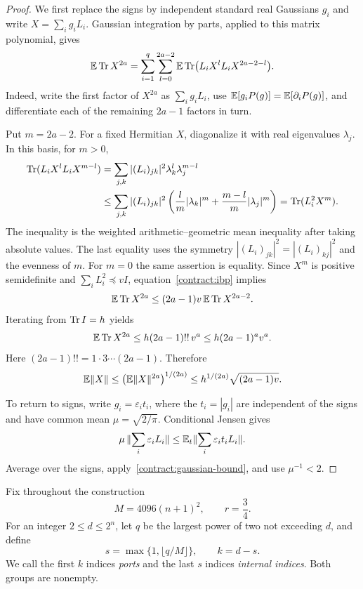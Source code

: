 \begin{proof}
We first replace the signs by independent standard real Gaussians $g_i$ and
write $X=\sum_i g_iL_i$.  Gaussian integration by parts, applied to this matrix
polynomial, gives
\begin{equation}\label{contract:ibp}
 \mathbb E\operatorname{Tr} X^{2a}
 =\sum_{i=1}^q\sum_{l=0}^{2a-2}
   \mathbb E\operatorname{Tr}\bigl(L_iX^lL_iX^{2a-2-l}\bigr).
\end{equation}
Indeed, write the first factor of $X^{2a}$ as $\sum_i g_iL_i$, use
$\mathbb E[g_iP(g)]=\mathbb E[\partial_iP(g)]$, and differentiate each of the remaining
$2a-1$ factors in turn.

Put $m=2a-2$.  For a fixed Hermitian $X$, diagonalize it with real eigenvalues
$\lambda_j$.  In this basis, for $m>0$,
\begin{align*}
 \operatorname{Tr}(L_iX^lL_iX^{m-l})
 &=\sum_{j,k}|(L_i)_{jk}|^2\lambda_k^l\lambda_j^{m-l}\\
 &\leq\sum_{j,k}|(L_i)_{jk}|^2
   \left(\frac lm|\lambda_k|^m+
              \frac{m-l}{m}|\lambda_j|^m\right)
 =\operatorname{Tr}(L_i^2X^m).
\end{align*}
The inequality is the weighted arithmetic--geometric mean inequality after
taking absolute values.  The last equality uses the symmetry
$|(L_i)_{jk}|^2=|(L_i)_{kj}|^2$ and the evenness of $m$.
For $m=0$ the same assertion is equality.  Since $X^m$ is positive semidefinite
and $\sum_iL_i^2\preceq vI$, equation~\eqref{contract:ibp} implies
\[
 \mathbb E\operatorname{Tr} X^{2a}\leq(2a-1)v\,\mathbb E\operatorname{Tr} X^{2a-2}.
\]
Iterating from $\operatorname{Tr} I=h$ yields
\[
 \mathbb E\operatorname{Tr} X^{2a}
 \leq h(2a-1)!!\,v^a
 \leq h(2a-1)^a v^a.
\]
Here $(2a-1)!!=1\cdot3\cdots(2a-1)$.  Therefore
\begin{equation}\label{contract:gaussian-bound}
 \mathbb E\lVert X\rVert
 \leq\bigl(\mathbb E\lVert X\rVert^{2a}\bigr)^{1/(2a)}
 \leq h^{1/(2a)}\sqrt{(2a-1)v}.
\end{equation}

To return to signs, write $g_i=\varepsilon_i t_i$, where the $t_i=|g_i|$ are
independent of the signs and have common mean $\mu=\sqrt{2/\pi}$.  Conditional
Jensen gives
\[
 \mu\,\lVert \sum_i\varepsilon_iL_i\rVert
 \leq\mathbb E_t\lVert \sum_i\varepsilon_i t_iL_i\rVert.
\]
Average over the signs, apply~\eqref{contract:gaussian-bound}, and use
$\mu^{-1}<2$.
\end{proof}

Fix throughout the construction
\begin{equation}\label{contract:parameters}
 M=4096(n+1)^2,\qquad r=\frac34.
\end{equation}
For an integer $2\leq d\leq2^n$, let $q$ be the largest power of two not
exceeding $d$, and define
\begin{equation}\label{contract:orders}
 s=\max\{1,\lfloor q/M\rfloor\},\qquad k=d-s.
\end{equation}
We call the first $k$ indices \emph{ports} and the last $s$ indices
\emph{internal indices}.  Both groups are nonempty.

